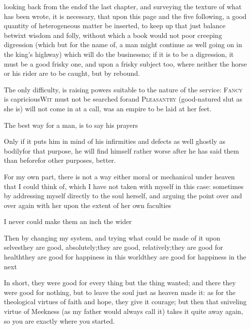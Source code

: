 \documentclass{article}
\begin{document}
 looking back from the end\break of the last chapter, and surveying
the texture of what has been wrote, it is necessary, that upon this page and the
five following, a good quantity of hete\-rogeneous matter be inserted, to keep up that
just balance betwixt wisdom and folly, without which a book would not
 poor creeping digression (which but for the name of, a
man might continue as well going on in the king’s highway) which will do the
business\tsh no; if it is to be a digression, it must be a good frisky one, and
upon a frisky subject too, where neither the horse or his rider are to be caught,
but by rebound.\etp{}

The only difficulty, is raising powers suitable to the nature of the service:
\textsc{Fancy} is capricious\tsk \textsc{Wit} must not be searched for\tsk and
\textsc{Pleasantry} (good-natured slut as she is) will not come in at a call, was an
empire to be laid at her feet.

\tsh The best way for a man, is to say his prayers\tsh

Only if it puts him in mind of his in\-firmities and defects as
well ghostly as bodily\tsk for that purpose, he will find himself
rather worse after he has said them than before\tsk for other
purposes, better.

For my own part, there is not a way either moral or mechanical
under heaven that I could think of, which I have not taken with
myself in this case: sometimes by addressing myself directly to the
soul herself, and arguing the point over and over again with her
upon the extent of her own faculties\tsh

\tsh I never could make them an inch the
wider\tsh

Then by changing my system, and trying what could be made of it
upon
selves\tsk they are good,
absolutely;\tsk they are good, relatively;\tsk they are good
for health\tsk they are good for happiness in this
world\tsk they are good for happiness in the
next\tsh{}

In short, they were good for every thing but the thing wanted;
and there they were good for nothing, but to leave the soul just as
heaven made it: as for the theological virtues of faith and hope,
they give it courage; but then that snive\-ling virtue of Meekness
(as my father would always call it) takes it quite away again, so
you are exactly where you started.
\end{document}
